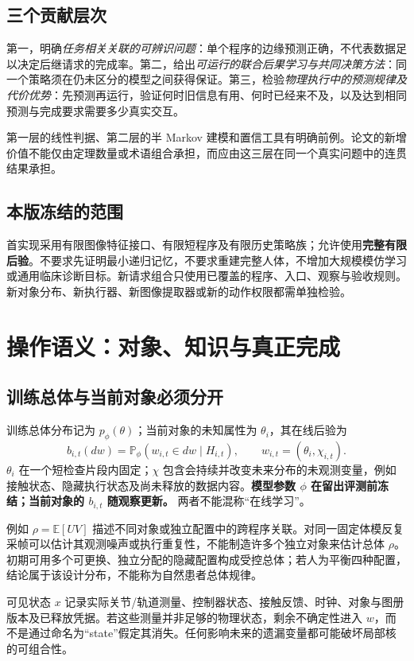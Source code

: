 \documentclass[11pt,a4paper,fontset=fandol]{ctexart}
\theoremstyle{definition}\newtheorem{definition}[theorem]{定义}
\theoremstyle{remark}\newtheorem{remark}[theorem]{说明}
\numberwithin{equation}{section}
\newcommand{\E}{\mathbb E}\newcommand{\Prb}{\mathbb P}
\begin{document}
\subsection{三个贡献层次}
第一，明确\emph{任务相关关联的可辨识问题}：单个程序的边缘预测正确，不代表数据足以决定后继请求的完成率。第二，给出\emph{可运行的联合后果学习与共同决策方法}：同一个策略须在仍未区分的模型之间获得保证。第三，检验\emph{物理执行中的预测规律及代价优势}：先预测再运行，验证何时旧信息有用、何时已经来不及，以及达到相同预测与完成要求需要多少真实交互。

第一层的线性判据、第二层的半 Markov 建模和置信工具有明确前例。论文的新增价值不能仅由定理数量或术语组合承担，而应由这三层在同一个真实问题中的连贯结果承担。

\subsection{本版冻结的范围}
首实现采用有限图像特征接口、有限短程序及有限历史策略族；允许使用\textbf{完整有限后验}。不要求先证明最小递归记忆，不要求重建完整人体，不增加大规模模仿学习或通用临床诊断目标。新请求组合只使用已覆盖的程序、入口、观察与验收规则。新对象分布、新执行器、新图像提取器或新的动作权限都需单独检验。

\section{操作语义：对象、知识与真正完成}
\label{sec:semantics}
\subsection{训练总体与当前对象必须分开}
训练总体分布记为 $p_\phi(\theta)$；当前对象的未知属性为 $\theta_i$，其在线后验为
\begin{equation}
 b_{i,t}(dw)=\Prb_\phi(w_{i,t}\in dw\mid H_{i,t}),\qquad
 w_{i,t}=(\theta_i,\chi_{i,t}).
 \label{eq:belief}
\end{equation}
$\theta_i$ 在一个短检查片段内固定；$\chi$ 包含会持续并改变未来分布的未观测变量，例如接触状态、隐藏执行状态及尚未释放的数据内容。\textbf{模型参数 $\phi$ 在留出评测前冻结；当前对象的 $b_{i,t}$ 随观察更新。} 两者不能混称“在线学习”。

例如 $\rho=\E[UV]$ 描述不同对象或独立配置中的跨程序关联。对同一固定体模反复采帧可以估计其观测噪声或执行重复性，不能制造许多个独立对象来估计总体 $\rho$。初期可用多个可更换、独立分配的隐藏配置构成受控总体；若人为平衡四种配置，结论属于该设计分布，不能称为自然患者总体规律。

可见状态 $x$ 记录实际关节/轨道测量、控制器状态、接触反馈、时钟、对象与图册版本及已释放凭据。若这些测量并非足够的物理状态，剩余不确定性进入 $w$，而不是通过命名为“state”假定其消失。任何影响未来的遗漏变量都可能破坏局部核的可组合性。
\end{document}
